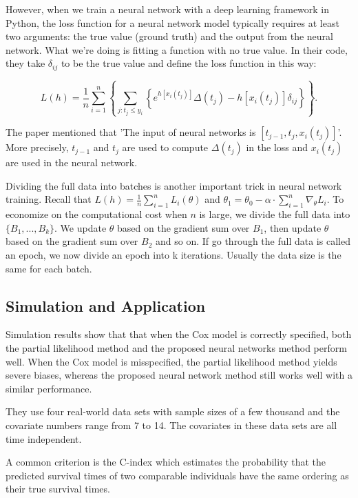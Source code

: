\documentclass[12pt]{article}
\begin{document}
However, when we train a neural network with a deep learning framework
in Python, the loss function for a neural network model typically
requires at least two arguments: the true value (ground truth) and the
output from the neural network. What we're doing is fitting a function
with no true value. In their code, they take $\delta_{ij}$ to be the
true value and define the loss function in this way:

$$L(h)=\frac{1}{n} \sum_{i=1}^n \left\{ \sum_{j:{t_j \leq y_i}} \left\{e^{h\left[x_i\left(t_j\right)\right]}\Delta(t_j)-h\left[x_i\left(t_j\right)\right] \delta_{i j}\right\} \right\}.$$

The paper mentioned that 'The input of neural networks is $\left[
t_{j-1}, t_j, x_i(t_j)\right]$'. More precisely, $t_{j-1}$ and $t_j$
are used to compute $\Delta(t_j)$ in the loss and $x_i(t_j)$ are used
in the neural network.

Dividing the full data into batches is another important trick in
neural network training. Recall that $L(h)=\frac{1}{n} \sum_{i=1}^n
L_{i}(\theta)$ and $\theta_{1} = \theta_{0} - \alpha \cdot
\sum_{i=1}^n \nabla_\theta L_i$. To economize on the computational
cost when $n$ is large, we divide the full data into $\{B_1, ...,
B_k\}$. We update $\theta$ based on the gradient sum over $B_1$, then
update $\theta$ based on the gradient sum over $B_2$ and so on. If go
through the full data is called an epoch, we now divide an epoch into
k iterations. Usually the data size is the same for each batch.

\subsection{Simulation and Application}

Simulation results show that that when the Cox model is correctly
speciﬁed, both the partial likelihood method and the proposed neural
networks method perform well. When the Cox model is misspeciﬁed, the
partial likelihood method yields severe biases, whereas the proposed
neural network method still works well with a similar performance.

They use four real-world data sets with sample sizes of a few thousand
and the covariate numbers range from 7 to 14. The covariates in these
data sets are all time independent.

A common criterion is the C-index which estimates the probability that
the predicted survival times of two comparable individuals have the
same ordering as their true survival times.
\end{document}
